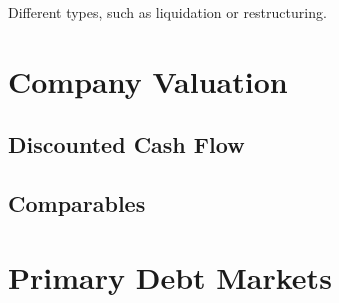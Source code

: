 \documentclass{article}
\begin{document}
    Different types, such as liquidation or restructuring. 

\section{Company Valuation}

  \subsection{Discounted Cash Flow}

  \subsection{Comparables}

\section{Primary Debt Markets}
\end{document}
